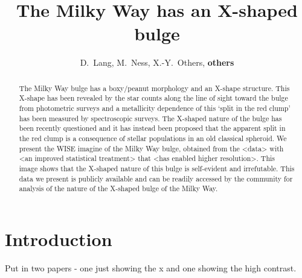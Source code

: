 \documentclass[12pt, preprint]{aastex}
\begin{document}
\title{The Milky Way has an X-shaped bulge} 
\author{D.~Lang,
M.~Ness,
X.-Y.~Others,
\textbf{others}}

\begin{abstract}%
The Milky Way bulge has a boxy/peanut morphology and an X-shape structure. This X-shape has been revealed by the 
star counts along the line of sight toward the bulge from photometric surveys and a metallicity dependence of this 
`split in the red clump' has been measured by spectroscopic surveys. The X-shaped nature of the bulge has been recently questioned and it has instead been proposed that the apparent split in the red clump is a consequence of stellar populations in an old classical spheroid. We present the WISE imagine of the Milky Way bulge, obtained from the <data> with <an improved statistical treatment> that <has enabled higher resolution>. This image shows that the X-shaped nature of this bulge is self-evident and irrefutable. This data we present is publicly available and can be readily accessed by the community for analysis of the nature of the X-shaped bulge of the Milky Way. 
\end{abstract}


\keywords{%
}

\section{Introduction}\label{sec:Intro}

Put in two papers - one just showing the x and one showing the high contrast. 

\end{document}
